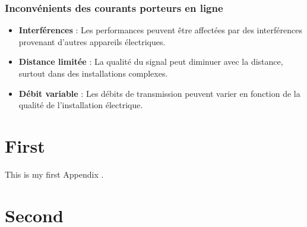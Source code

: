 \documentclass[a4paper,draft,twocolumn]{report}
\begin{document}
\subsection{Inconvénients des courants porteurs en ligne}
\begin{itemize}
    \item \textbf{Interférences} : Les performances peuvent être affectées par des interférences provenant d'autres appareils électriques.
    \item \textbf{Distance limitée} : La qualité du signal peut diminuer avec la distance, surtout dans des installations complexes.
    \item \textbf{Débit variable} : Les débits de transmission peuvent varier en fonction de la qualité de l'installation électrique.
\end{itemize}

\appendix
\chapter{First}
This is my first Appendix .
\chapter{Second}
\end{document}
